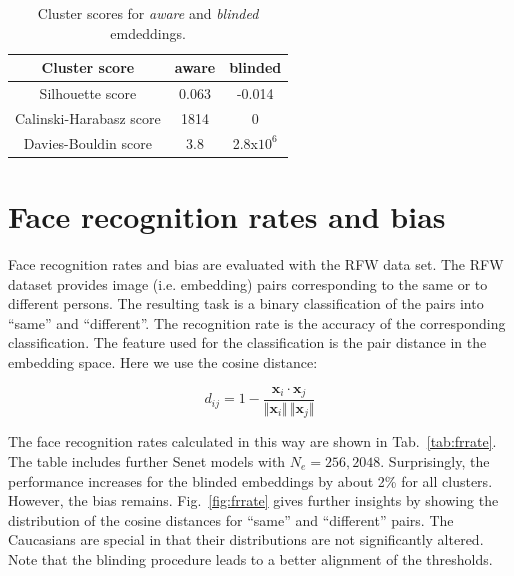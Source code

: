 \documentclass{report}
\begin{document}
\begin{table}
\begin{center}
\begin{tabular}{ c|c|c }
Cluster score & aware  & blinded  \\
\hline
Silhouette score & 0.063 & -0.014 \\ 
Calinski-Harabasz score & 1814 & 0 \\  
Davies-Bouldin score & 3.8 & 2.8x$10^6$  
\end{tabular}
\end{center}
\caption{Cluster scores for  \emph{aware}  and  \emph{blinded} emdeddings.}
\label{tab:cluster}
\end{table}

\section{Face recognition rates and bias}

Face recognition rates and bias are evaluated with the RFW data set. The RFW dataset provides image (i.e. embedding) pairs corresponding to the same or to different persons. The resulting task is a binary classification of the pairs into ``same'' and ``different''. The recognition rate is the accuracy of the corresponding classification. The feature used for the classification is the pair distance in the embedding space. Here we use the cosine distance:

\begin{equation}
\label{eq:cos}
	d_{ij} = 1 - \frac{\bm{x}_i\cdot \bm{x}_j}{\Vert \bm{x}_i \Vert\,\Vert \bm{x}_j \Vert }
\end{equation} 

\noindent The face recognition rates calculated in this way are shown in  Tab.~\ref{tab:frrate}. The table includes further Senet models with $N_e=256, 2048$. Surprisingly, the performance increases for the blinded embeddings by about 2\% for all clusters. However, the bias remains.  Fig.~\ref{fig:frrate} gives further insights by showing the distribution of the cosine distances for ``same'' and ``different'' pairs. The Caucasians are special in that their distributions are not significantly altered. Note that the blinding procedure leads to a better alignment of the thresholds. 
\end{document}
